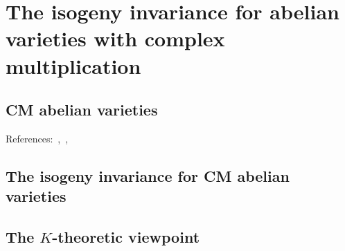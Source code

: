 
\chapter{The isogeny invariance for abelian varieties with complex multiplication}
\label{chap1}

\tab


\tab

\section{CM abelian varieties}

References:~\cite{Sh1998},~\cite{Mu1974},~\cite{BL2004}

\newpage
\section{The isogeny invariance for CM abelian varieties}

\newpage
\section{The $K$-theoretic viewpoint}



\endinput

Any text after an \endinput is ignored.
You could put scraps here or things in progress.
